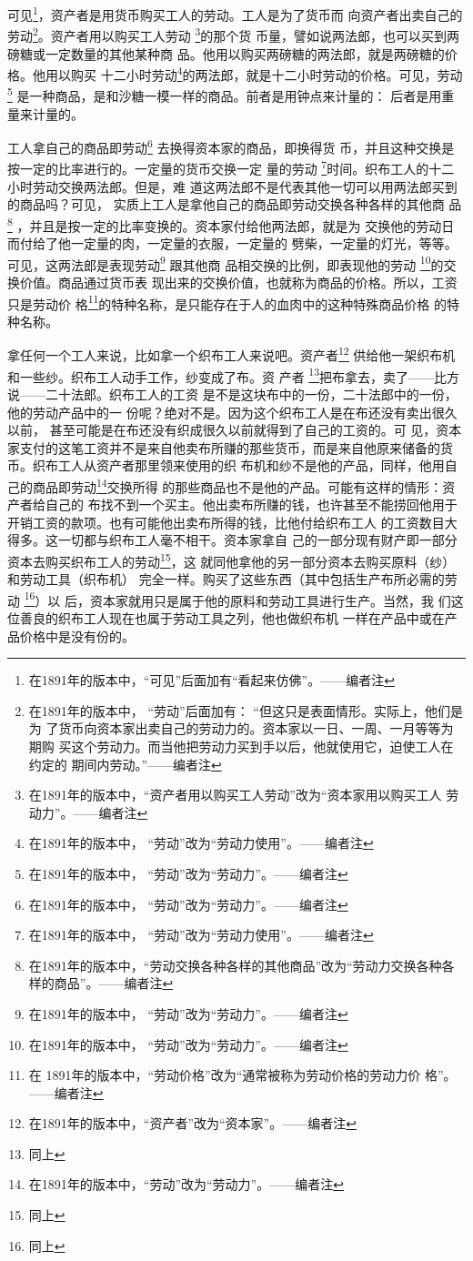 \documentclass[a4paper,twoside,12pt,AutoFakeBold]{ctexart}
\begin{document}
可见\footnote{在1891年的版本中，“可见”后面加有“看起来仿佛”。——编者注}，资产者是用货币购买工人的劳动。工人是为了货币而
向资产者出卖自己的劳动\footnote{在1891年的版本中， “劳动”后面加有： “但这只是表面情形。实际上，他们是为
了货币向资本家出卖自己的劳动力的。资本家以一日、一周、一月等等为期购
买这个劳动力。而当他把劳动力买到手以后，他就使用它，迫使工人在约定的
期间内劳动。”——编者注}。资产者用以购买工人劳动 \footnote{在1891年的版本中，“资产者用以购买工人劳动”改为“资本家用以购买工人
劳动力”。——编者注}的那个货
币量，譬如说两法郎，也可以买到两磅糖或一定数量的其他某种商
品。他用以购买两磅糖的两法郎，就是两磅糖的价格。他用以购买
十二小时劳动\footnote{在1891年的版本中， “劳动”改为“劳动力使用”。——编者注}的两法郎，就是十二小时劳动的价格。可见，劳动 \footnote{在1891年的版本中， “劳动”改为“劳动力”。——编者注}
是一种商品，是和沙糖一模一样的商品。前者是用钟点来计量的：
后者是用重量来计量的。

工人拿自己的商品即劳动\footnote{在1891年的版本中， “劳动”改为“劳动力”。——编者注} 去换得资本家的商品，即换得货
币，并且这种交换是按一定的比率进行的。一定量的货币交换一定
量的劳动 \footnote{在1891年的版本中， “劳动”改为“劳动力使用”。——编者注}时间。织布工人的十二小时劳动交换两法郎。但是，难
道这两法郎不是代表其他一切可以用两法郎买到的商品吗？可见，
实质上工人是拿他自己的商品即劳动交换各种各样的其他商
品 \footnote{在1891年的版本中，“劳动交换各种各样的其他商品”改为“劳动力交换各种各样的商品”。——编者注} ，并且是按一定的比率变换的。资本家付给他两法郎，就是为
交换他的劳动日而付给了他一定量的肉，一定量的衣服，一定量的
劈柴，一定量的灯光，等等。可见，这两法郎是表现劳动\footnote{在1891年的版本中， “劳动”改为“劳动力”。——编者注} 跟其他商
品相交换的比例，即表现他的劳动 \footnote{在1891年的版本中， “劳动”改为“劳动力”。——编者注}的交换价值。商品通过货币表
现出来的交换价值，也就称为商品的价格。所以，工资只是劳动价
格\footnote{在 1891年的版本中，“劳动价格”改为“通常被称为劳动价格的劳动力价
格”。——编者注}的特种名称，是只能存在于人的血肉中的这种特殊商品价格
的特种名称。

拿任何一个工人来说，比如拿一个织布工人来说吧。资产者\footnote{在1891年的版本中，“资产者”改为“资本家”。——编者注}
供给他一架织布机和一些纱。织布工人动手工作，纱变成了布。资
产者 \footnote{同上}把布拿去，卖了——比方说——二十法郎。织布工人的工资
是不是这块布中的一份，二十法郎中的一份，他的劳动产品中的一
份呢？绝对不是。因为这个织布工人是在布还没有卖出很久以前，
甚至可能是在布还没有织成很久以前就得到了自己的工资的。可
见，资本家支付的这笔工资并不是来自他卖布所赚的那些货币，而是来自他原来储备的货币。织布工人从资产者那里领来使用的织
布机和纱不是他的产品，同样，他用自己的商品即劳动\footnote{在1891年的版本中，“劳动”改为“劳动力”。——编者注}交换所得
的那些商品也不是他的产品。可能有这样的情形：资产者给自己的
布找不到一个买主。他出卖布所赚的钱，也许甚至不能捞回他用于
开销工资的款项。也有可能他出卖布所得的钱，比他付给织布工人
的工资数目大得多。这一切都与织布工人毫不相干。资本家拿自
己的一部分现有财产即一部分资本去购买织布工人的劳动\footnote{同上}，这
就同他拿他的另一部分资本去购买原料（纱）和劳动工具（织布机）
完全一样。购买了这些东西（其中包括生产布所必需的劳动 \footnote{同上}）以
后，资本家就用只是属于他的原料和劳动工具进行生产。当然，我
们这位善良的织布工人现在也属于劳动工具之列，他也做织布机
一样在产品中或在产品价格中是没有份的。
\end{document}
